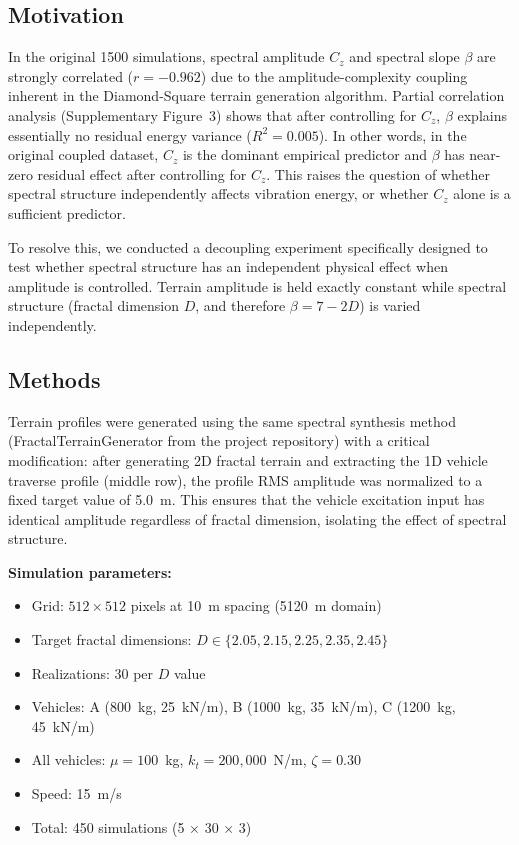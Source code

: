\documentclass[11pt]{article}
\begin{document}
\subsection{Motivation}

In the original 1500 simulations, spectral amplitude $C_z$ and spectral slope $\beta$ are strongly correlated ($r = -0.962$) due to the amplitude-complexity coupling inherent in the Diamond-Square terrain generation algorithm. Partial correlation analysis (Supplementary Figure~3) shows that after controlling for $C_z$, $\beta$ explains essentially no residual energy variance ($R^2 = 0.005$). In other words, in the original coupled dataset, $C_z$ is the dominant empirical predictor and $\beta$ has near-zero residual effect after controlling for $C_z$. This raises the question of whether spectral structure independently affects vibration energy, or whether $C_z$ alone is a sufficient predictor.

To resolve this, we conducted a decoupling experiment specifically designed to test whether spectral structure has an independent physical effect when amplitude is controlled. Terrain amplitude is held exactly constant while spectral structure (fractal dimension $D$, and therefore $\beta = 7-2D$) is varied independently.

\subsection{Methods}

Terrain profiles were generated using the same spectral synthesis method (FractalTerrainGenerator from the project repository) with a critical modification: after generating 2D fractal terrain and extracting the 1D vehicle traverse profile (middle row), the profile RMS amplitude was normalized to a fixed target value of 5.0~m. This ensures that the vehicle excitation input has identical amplitude regardless of fractal dimension, isolating the effect of spectral structure.

\textbf{Simulation parameters:}
\begin{itemize}
\item Grid: $512 \times 512$ pixels at 10~m spacing (5120~m domain)
\item Target fractal dimensions: $D \in \{2.05, 2.15, 2.25, 2.35, 2.45\}$
\item Realizations: 30 per $D$ value
\item Vehicles: A (800~kg, 25~kN/m), B (1000~kg, 35~kN/m), C (1200~kg, 45~kN/m)
\item All vehicles: $\mu = 100$~kg, $k_t = 200{,}000$~N/m, $\zeta = 0.30$
\item Speed: 15~m/s
\item Total: 450 simulations (5 $\times$ 30 $\times$ 3)
\end{itemize}
\end{document}
